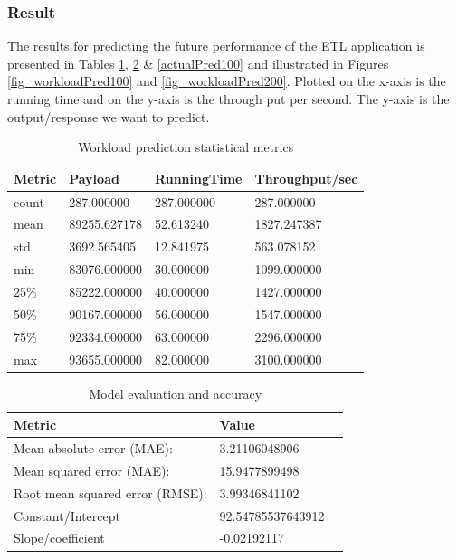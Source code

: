\documentclass[12pt, letterpaper, titlepage]{report}
\begin{document}
\subsubsection{Result} 
The results for predicting the future performance of the ETL application is presented in Tables \ref{workloadPredDesc}, \ref{regresModelEval100} \& \ref{actualPred100} and illustrated in Figures \ref{fig_workloadPred100} and \ref{fig_workloadPred200}. Plotted on the x-axis is the running time and on the y-axis is the through put per second. The y-axis is the output/response we want to predict.

\begin{table}[h!]
	\centering
	\begin{tabular}{|l|l|l|l|}
		\hline
		\textbf{Metric} & \textbf{Payload} & \textbf{RunningTime} & \textbf{Throughput/sec} \\ \hline
		
				count  &  287.000000 &  287.000000 &     287.000000 \\ \hline
				mean &  89255.627178 &   52.613240  &   1827.247387 \\ \hline
				std &    3692.565405 &   12.841975 &     563.078152 \\ \hline
				min &   83076.000000 &   30.000000  &   1099.000000 \\ \hline
				25\%  &  85222.000000  &  40.000000 &    1427.000000 \\ \hline
				50\%  &  90167.000000 &   56.000000 &    1547.000000 \\ \hline
				75\%  &  92334.000000 &   63.000000  &   2296.000000 \\ \hline
				max  &  93655.000000  &  82.000000   &  3100.000000 \\ \hline

	\end{tabular}
	\caption{Workload prediction statistical metrics}
	\label{workloadPredDesc}
\end{table}


\begin{table}[h!]
	\centering
	\begin{tabular}{|l|l|l|}
		\hline
		\textbf{Metric} & \textbf{Value} \\ \hline
		Mean absolute error (MAE):  &  3.21106048906 \\ \hline
		Mean squared error (MAE):   &  15.9477899498 \\ \hline
		Root mean squared error (RMSE):   &  3.99346841102 \\ \hline
		Constant/Intercept  &  92.54785537643912 \\ \hline
		Slope/coefficient  &  -0.02192117\\ \hline
	\end{tabular}
	\caption{Model evaluation and accuracy}
	\label{regresModelEval100}
\end{table}
\pagebreak
\end{document}
